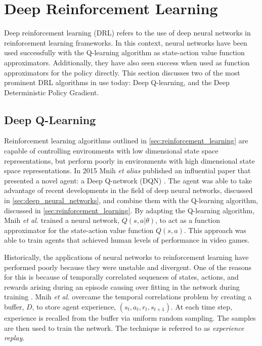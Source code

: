 \section{Deep Reinforcement Learning}\label{sec:deep_reinforcement_learning}
Deep reinforcement learning (DRL) refers to the use of deep neural networks in reinforcement learning frameworks. In this context, neural networks have been used successfully with the Q-learning algorithm as state-action value function approximators. Additionally, they have also seen success when used as function approximators for the policy directly. This section discusses two of the most prominent DRL algorithms in use today: Deep Q-learning, and the Deep Deterministic Policy Gradient.

\subsection{Deep Q-Learning}\label{ssec:deep_q_learning}
Reinforcement learning algorithms outlined in \textsection \ref{sec:reinforcement_learning} are capable of controlling environments with low dimensional state space representations, but perform poorly in environments with high dimensional state space representations. In 2015 Mnih \textit{et alias} published an influential paper that presented a novel agent: a Deep Q-network (DQN) \cite{Mnih2015}. The agent was able to take advantage of recent developments in the field of deep neural networks, discussed in \textsection \ref{sec:deep_neural_networks}, and combine them with the Q-learning algorithm, discussed in \textsection \ref{sec:reinforcement_learning}. By adapting the Q-learning algorithm, Mnih \textit{et al.} trained a neural network, $Q(s,a|\theta)$, to act as a function approximator for the state-action value function $Q(s,a)$. This approach was able to train agents that achieved human levels of performance in video games.

Historically, the applications of neural networks to reinforcement learning have performed poorly because they were unstable and divergent. One of the reasons for this is because of temporally correlated sequences of states, actions, and rewards arising during an episode causing over fitting in the network during training \cite{Tsitsiklis1997}. Mnih \textit{et al.} overcame the temporal correlations problem by creating a buffer, $D$, to store agent experience, $(s_t, a_t, r_t, s_{t+1})$. At each time step, experience is recalled from the buffer via uniform random sampling. The samples are then used to train the network. The technique is referred to as \textit{experience replay}.

